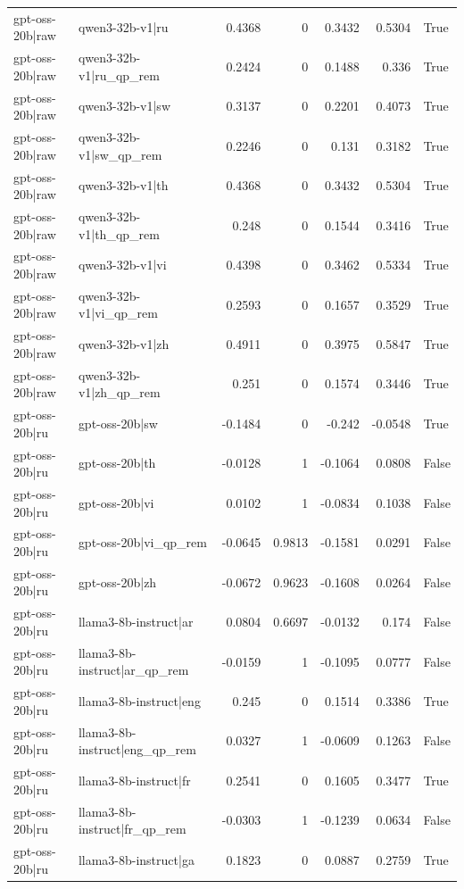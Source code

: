 \begin{table}
\begin{tabular}{l l r r r r l}
gpt-oss-20b|raw & qwen3-32b-v1|ru & 0.4368 & 0 & 0.3432 & 0.5304 & True \\
gpt-oss-20b|raw & qwen3-32b-v1|ru_qp_rem & 0.2424 & 0 & 0.1488 & 0.336 & True \\
gpt-oss-20b|raw & qwen3-32b-v1|sw & 0.3137 & 0 & 0.2201 & 0.4073 & True \\
gpt-oss-20b|raw & qwen3-32b-v1|sw_qp_rem & 0.2246 & 0 & 0.131 & 0.3182 & True \\
gpt-oss-20b|raw & qwen3-32b-v1|th & 0.4368 & 0 & 0.3432 & 0.5304 & True \\
gpt-oss-20b|raw & qwen3-32b-v1|th_qp_rem & 0.248 & 0 & 0.1544 & 0.3416 & True \\
gpt-oss-20b|raw & qwen3-32b-v1|vi & 0.4398 & 0 & 0.3462 & 0.5334 & True \\
gpt-oss-20b|raw & qwen3-32b-v1|vi_qp_rem & 0.2593 & 0 & 0.1657 & 0.3529 & True \\
gpt-oss-20b|raw & qwen3-32b-v1|zh & 0.4911 & 0 & 0.3975 & 0.5847 & True \\
gpt-oss-20b|raw & qwen3-32b-v1|zh_qp_rem & 0.251 & 0 & 0.1574 & 0.3446 & True \\
gpt-oss-20b|ru & gpt-oss-20b|sw & -0.1484 & 0 & -0.242 & -0.0548 & True \\
gpt-oss-20b|ru & gpt-oss-20b|th & -0.0128 & 1 & -0.1064 & 0.0808 & False \\
gpt-oss-20b|ru & gpt-oss-20b|vi & 0.0102 & 1 & -0.0834 & 0.1038 & False \\
gpt-oss-20b|ru & gpt-oss-20b|vi_qp_rem & -0.0645 & 0.9813 & -0.1581 & 0.0291 & False \\
gpt-oss-20b|ru & gpt-oss-20b|zh & -0.0672 & 0.9623 & -0.1608 & 0.0264 & False \\
gpt-oss-20b|ru & llama3-8b-instruct|ar & 0.0804 & 0.6697 & -0.0132 & 0.174 & False \\
gpt-oss-20b|ru & llama3-8b-instruct|ar_qp_rem & -0.0159 & 1 & -0.1095 & 0.0777 & False \\
gpt-oss-20b|ru & llama3-8b-instruct|eng & 0.245 & 0 & 0.1514 & 0.3386 & True \\
gpt-oss-20b|ru & llama3-8b-instruct|eng_qp_rem & 0.0327 & 1 & -0.0609 & 0.1263 & False \\
gpt-oss-20b|ru & llama3-8b-instruct|fr & 0.2541 & 0 & 0.1605 & 0.3477 & True \\
gpt-oss-20b|ru & llama3-8b-instruct|fr_qp_rem & -0.0303 & 1 & -0.1239 & 0.0634 & False \\
gpt-oss-20b|ru & llama3-8b-instruct|ga & 0.1823 & 0 & 0.0887 & 0.2759 & True \\

\end{tabular}
\end{table}
